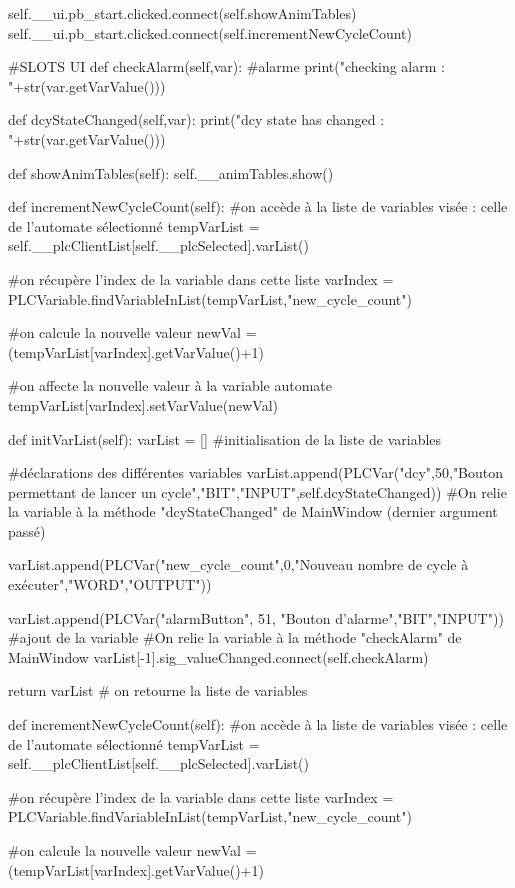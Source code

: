 {\begin{Python}
		self.__ui.pb_start.clicked.connect(self.showAnimTables)
		self.__ui.pb_start.clicked.connect(self.incrementNewCycleCount)

	
	#SLOTS UI
	def checkAlarm(self,var):
		#alarme
		print("checking alarm : "+str(var.getVarValue()))
	
	def dcyStateChanged(self,var):
		print("dcy state has changed : "+str(var.getVarValue()))

	def showAnimTables(self):
		self.__animTables.show()
	
	def incrementNewCycleCount(self):
		#on accède à la liste de variables visée : celle de l'automate sélectionné
		tempVarList = self.__plcClientList[self.__plcSelected].varList()

		#on récupère l'index de la variable dans cette liste
		varIndex = PLCVariable.findVariableInList(tempVarList,"new_cycle_count")

		#on calcule la nouvelle valeur
		newVal = (tempVarList[varIndex].getVarValue()+1)%

		#on affecte la nouvelle valeur à la variable automate
		tempVarList[varIndex].setVarValue(newVal)

	def initVarList(self):
		varList = []  #initialisation de la liste de variables


		#déclarations des différentes variables
		varList.append(PLCVar("dcy",50,"Bouton permettant de lancer un cycle","BIT","INPUT",self.dcyStateChanged))
		#On relie la variable à la méthode "dcyStateChanged" de MainWindow (dernier argument passé)

		varList.append(PLCVar("new_cycle_count",0,"Nouveau nombre de cycle à exécuter","WORD","OUTPUT"))

		varList.append(PLCVar("alarmButton", 51, "Bouton d'alarme","BIT","INPUT")) #ajout de la variable
 		#On relie la variable à la méthode "checkAlarm" de MainWindow
		varList[-1].sig_valueChanged.connect(self.checkAlarm)

		return varList  # on retourne la liste de variables


def incrementNewCycleCount(self):
	#on accède à la liste de variables visée : celle de l'automate sélectionné
	tempVarList = self.__plcClientList[self.__plcSelected].varList()

	#on récupère l'index de la variable dans cette liste
	varIndex = PLCVariable.findVariableInList(tempVarList,"new_cycle_count")

	#on calcule la nouvelle valeur
	newVal = (tempVarList[varIndex].getVarValue()+1)%


\end{Python}}

